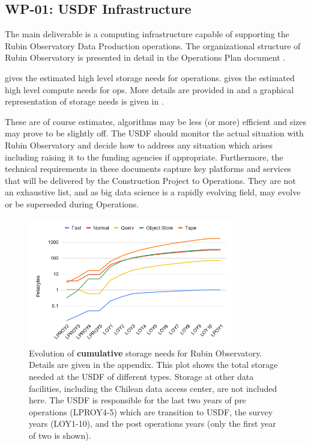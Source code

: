 \subsection{\textbf{WP-01}: \gls{USDF} Infrastructure}
\label{sect:wp01}
The main deliverable is a computing infrastructure capable of supporting
the Rubin Observatory Data Production operations. The organizational structure of Rubin Observatory is presented in detail in the Operations Plan document  .

  gives the estimated high level storage needs for operations.
 gives the estimated high level compute needs for ops.
More details are provided in  and a graphical
representation of storage needs is given in .


These are of course estimates, algorithms may be less (or more) efficient and sizes may prove to be slightly off. The USDF should monitor the actual situation with Rubin Observatory and decide how to address any
situation which arises including raising it to the funding agencies if appropriate. Furthermore, the technical requirements in these documents capture key platforms and services that will be delivered by the Construction Project to Operations. They are not an exhaustive list, and as big data science is a rapidly evolving field, may evolve or be superseded during Operations.

\begin{figure}
\begin{center}
\includegraphics[width=0.8\textwidth]{figs/storage}
\end{center}
\caption{Evolution of {\bf cumulative} storage needs for Rubin Observatory. Details are given in the appendix. This plot shows the total storage needed at the \gls{USDF} of different types. Storage at other data facilities, including the Chilean data access center, are not included here. The \gls{USDF} is responsible for the last two years of pre operations (LPROY4-5) which are transition to \gls{USDF}, the survey years (LOY1-10), and the post operations years (only the first year of two is shown).\label{fig:storage}}
\end{figure}

